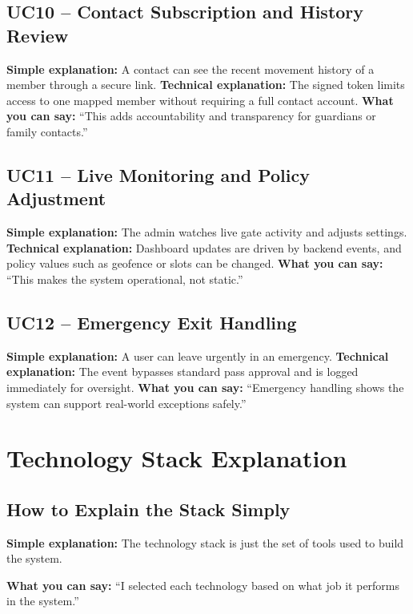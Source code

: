 \documentclass[12pt,letterpaper]{article}
\newcommand{\simple}[1]{\textbf{Simple explanation:} #1}
\newcommand{\technical}[1]{\textbf{Technical explanation:} #1}
\newcommand{\say}[1]{\textbf{What you can say:} ``#1''}
\begin{document}
\subsection{UC10 -- Contact Subscription and History Review}
\simple{A contact can see the recent movement history of a member through a secure link.}
\technical{The signed token limits access to one mapped member without requiring a full contact account.}
\say{This adds accountability and transparency for guardians or family contacts.}

\subsection{UC11 -- Live Monitoring and Policy Adjustment}
\simple{The admin watches live gate activity and adjusts settings.}
\technical{Dashboard updates are driven by backend events, and policy values such as geofence or slots can be changed.}
\say{This makes the system operational, not static.}

\subsection{UC12 -- Emergency Exit Handling}
\simple{A user can leave urgently in an emergency.}
\technical{The event bypasses standard pass approval and is logged immediately for oversight.}
\say{Emergency handling shows the system can support real-world exceptions safely.}

\section{Technology Stack Explanation}

\subsection{How to Explain the Stack Simply}

\simple{The technology stack is just the set of tools used to build the system.}

\say{I selected each technology based on what job it performs in the system.}
\end{document}
